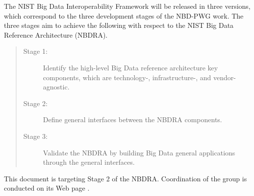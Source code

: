 The NIST Big Data Interoperability Framework will be released in three
versions, which correspond to the three development stages of the
NBD-PWG work. The three stages aim to achieve the following with
respect to the NIST Big Data Reference Architecture (NBDRA).

\begin{quote}
\begin{description}
\item[Stage 1:] Identify the high-level Big Data reference architecture
  key components, which are technology-, infrastructure-, and
  vendor-agnostic.
\item[Stage 2:] Define general interfaces between the NBDRA components.
\item[Stage 3:] Validate the NBDRA by building Big Data general
  applications through the general interfaces.
\end{description}
\end{quote}

This document is targeting Stage 2 of the NBDRA. Coordination of the
group is conducted on its Web page \cite{www-nbdwg}. 
